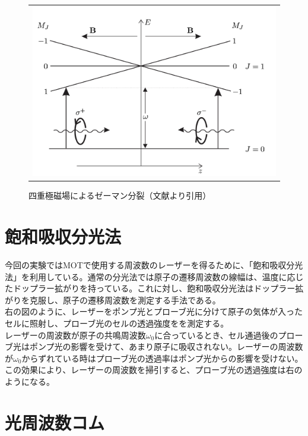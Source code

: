 \documentclass[uplatex,dvipdfmx,a4paper,report,papersize,11pt]{jsbook}
\begin{document}
\begin{figure}[htpb]
\begin{tabular}{c}
      \begin{minipage}{0.50\hsize}
        \centering
          \includegraphics[keepaspectratio, scale=0.40, angle=0]
                          {figures/MOT_zeeman_split.png}
                          \caption{四重極磁場によるゼーマン分裂（文献\cite{Foot:1080846}より引用）}
                          \label{MOT_zeeman_split}
      \end{minipage}


    \end{tabular}
\end{figure}

\newpage
\section{飽和吸収分光法}
今回の実験ではMOTで使用する周波数のレーザーを得るために、「飽和吸収分光法」を利用している。通常の分光法では原子の遷移周波数の線幅は、温度に応じたドップラー拡がりを持っている。これに対し、飽和吸収分光法はドップラー拡がりを克服し、原子の遷移周波数を測定する手法である。\\右の図のように、レーザーをポンプ光とプローブ光に分けて原子の気体が入ったセルに照射し、プローブ光のセルの透過強度をを測定する。\\レーザーの周波数が原子の共鳴周波数$\omega_0$に合っているとき、セル通過後のプローブ光はポンプ光の影響を受けて、あまり原子に吸収されない。レーザーの周波数が$\omega_0$からずれている時はプローブ光の透過率はポンプ光からの影響を受けない。この効果により、レーザーの周波数を掃引すると、プローブ光の透過強度は右のようになる\cite{Foot:1080846}。

\section{光周波数コム}
\end{document}
